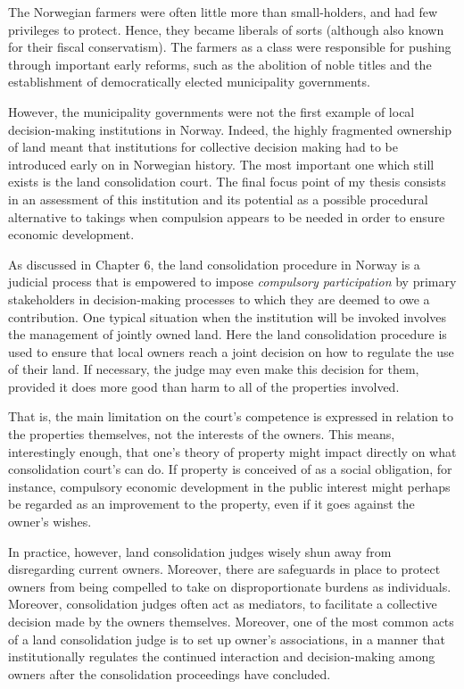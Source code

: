 The Norwegian farmers were often little more than small-holders, and had few privileges to protect. Hence, they became liberals of sorts (although also known for their fiscal conservatism). The farmers as a class were responsible for pushing through important early reforms, such as the abolition of noble titles and the establishment of democratically elected municipality governments.

However, the municipality governments were not the first example of local decision-making institutions in Norway. Indeed, the highly fragmented ownership of land meant that institutions for collective decision making had to be introduced early on in Norwegian history. The most important one which still exists is the land consolidation court. The final focus point of my thesis consists in an assessment of this institution and its potential as a possible procedural alternative to takings when compulsion appears to be needed in order to ensure economic development.

As discussed in Chapter 6, the land consolidation procedure in Norway is a judicial process that is empowered to impose {\it compulsory participation} by primary stakeholders in decision-making processes to which they are deemed to owe a contribution. One typical situation when the institution will be invoked involves the management of jointly owned land. Here the land consolidation procedure is used to ensure that local owners reach a joint decision on how to regulate the use of their land. If necessary, the judge may even make this decision for them, provided it does more good than harm to all of the properties involved.

That is, the main limitation on the court's competence is expressed in relation to the properties themselves, not the interests of the owners. This means, interestingly enough, that one's theory of property might impact directly on what consolidation court's can do. If property is conceived of as a social obligation, for instance, compulsory economic development in the public interest might perhaps be regarded as an improvement to the property, even if it goes against the owner's wishes.

In practice, however, land consolidation judges wisely shun away from disregarding current owners. Moreover, there are safeguards in place to protect owners from being compelled to take on disproportionate burdens as individuals. Moreover, consolidation judges often act as mediators, to facilitate a collective decision made by the owners themselves. Moreover, one of the most common acts of a land consolidation judge is to set up owner's associations, in a manner that institutionally regulates the continued interaction and decision-making among owners after the consolidation proceedings have concluded.

